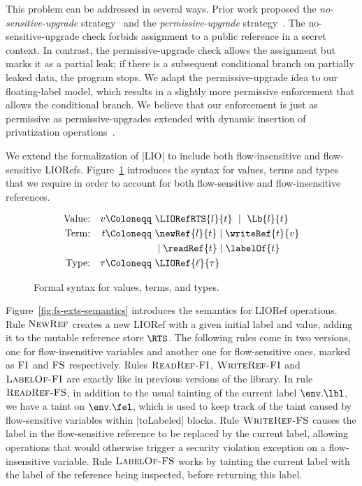 This problem can be addressed in several ways. Prior work proposed the
\emph{no-sensitive-upgrade} strategy~\citep{?} and the
\emph{permissive-upgrade} strategy~\citep{?}. The no-sensitive-upgrade
check forbids assignment to a public reference in a secret context. In
contrast, the permissive-upgrade check allows the assignment but marks
it as a partial leak; if there is a subsequent conditional branch on
partially leaked data, the program stops. We adapt the
permissive-upgrade idea to our floating-label model, which results in
a slightly more permissive enforcement that allows the conditional
branch. We believe that our enforcement is just as permissive as %
permissive-upgrades extended with dynamic insertion of privatization
operations~\citep{?}.

We extend the formalization of |LIO| to include both flow-insensitive
and flow-sensitive LIORefs. Figure~\ref{fig:fs-exts-syntax} introduces
the syntax for values, terms and types that we require in order to
account for both flow-sensitive and flow-insensitive references.

\begin{figure}[!ht] %
\vspace*{-5pt}
\begin{align*}
\textrm{Value:}   && v    \Coloneqq~ &
                                 \LIORefRTS{l}{t}
                           \ \mid\  \Lb{l}{t} \\
\textrm{Term:}    && t    \Coloneqq~ &
                             \newRef{l}{t}
                           \mid  \writeRef{t}{v} \\
                  && &     \mid  \readRef{t}
                           \mid  \labelOf{t} \\
\textrm{Type:}    && \tau \Coloneqq~& 
                          \LIORef{\ell}{\tau} \\
\end{align*}
\caption{Formal syntax for values, terms, and types.\label{fig:fs-exts-syntax}}
\vspace*{-5pt}
\end{figure} 

Figure~\ref{fig:fs-exts-semantics} introduces the semantics for LIORef
operations. Rule $\textsc{NewRef}$ creates a new LIORef with a given
initial label and value, adding it to the mutable reference store
$\RTS$. The following rules come in two versions, one for
flow-insensitive variables and another one for flow-sensitive ones,
marked as $\textsc{FI}$ and $\textsc{FS}$ respectively. Rules
$\textsc{ReadRef-FI}$, $\textsc{WriteRef-FI}$ and
$\textsc{LabelOf-FI}$ are exactly like in previous versions of the
library. In rule $\textsc{ReadRef-FS}$, in addition to the usual
tainting of the current label $\env.\lbl$, we have a taint on
$\env.\fel$, which is used to keep track of the taint caused by
flow-sensitive variables within |toLabeled| blocks. Rule
$\textsc{WriteRef-FS}$ causes the label in the flow-sensitive
reference to be replaced by the current label, allowing operations
that would otherwise trigger a security violation exception on a
flow-insensitive variable. Rule $\textsc{LabelOf-FS}$ works by
tainting the current label with the label of the reference being
inspected, before returning this label.

